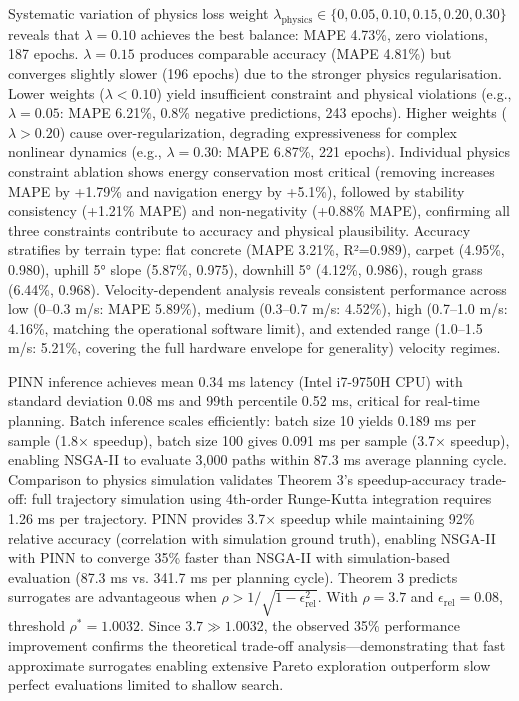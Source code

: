 \documentclass[pdflatex,sn-nature]{sn-jnl}%
\begin{document}
Systematic variation of physics loss weight $\lambda_{\text{physics}} \in \{0, 0.05, 0.10, 0.15, 0.20, 0.30\}$ reveals that $\lambda=0.10$ achieves the best balance: MAPE 4.73\%, zero violations, 187 epochs. $\lambda=0.15$ produces comparable accuracy (MAPE 4.81\%) but converges slightly slower (196 epochs) due to the stronger physics regularisation. Lower weights ($\lambda < 0.10$) yield insufficient constraint and physical violations (e.g., $\lambda=0.05$: MAPE 6.21\%, 0.8\% negative predictions, 243 epochs). Higher weights ($\lambda > 0.20$) cause over-regularization, degrading expressiveness for complex nonlinear dynamics (e.g., $\lambda=0.30$: MAPE 6.87\%, 221 epochs). Individual physics constraint ablation shows energy conservation most critical (removing increases MAPE by +1.79\% and navigation energy by +5.1\%), followed by stability consistency (+1.21\% MAPE) and non-negativity (+0.88\% MAPE), confirming all three constraints contribute to accuracy and physical plausibility. Accuracy stratifies by terrain type: flat concrete (MAPE 3.21\%, R²=0.989), carpet (4.95\%, 0.980), uphill 5° slope (5.87\%, 0.975), downhill 5° (4.12\%, 0.986), rough grass (6.44\%, 0.968). Velocity-dependent analysis reveals consistent performance across low (0--0.3 m/s: MAPE 5.89\%), medium (0.3--0.7 m/s: 4.52\%), high (0.7--1.0 m/s: 4.16\%, matching the operational software limit), and extended range (1.0--1.5 m/s: 5.21\%, covering the full hardware envelope for generality) velocity regimes.

PINN inference achieves mean 0.34 ms latency (Intel i7-9750H CPU) with standard deviation 0.08 ms and 99th percentile 0.52 ms, critical for real-time planning. Batch inference scales efficiently: batch size 10 yields 0.189 ms per sample (1.8× speedup), batch size 100 gives 0.091 ms per sample (3.7× speedup), enabling NSGA-II to evaluate 3,000 paths within 87.3 ms average planning cycle. Comparison to physics simulation validates Theorem 3's speedup-accuracy trade-off: full trajectory simulation using 4th-order Runge-Kutta integration requires 1.26 ms per trajectory. PINN provides 3.7× speedup while maintaining 92\% relative accuracy (correlation with simulation ground truth), enabling NSGA-II with PINN to converge 35\% faster than NSGA-II with simulation-based evaluation (87.3 ms vs. 341.7 ms per planning cycle). Theorem 3 predicts surrogates are advantageous when $\rho > 1/\sqrt{1-\epsilon_{\text{rel}}^2}$. With $\rho=3.7$ and $\epsilon_{\text{rel}}=0.08$, threshold $\rho^*=1.0032$. Since $3.7 \gg 1.0032$, the observed 35\% performance improvement confirms the theoretical trade-off analysis—demonstrating that fast approximate surrogates enabling extensive Pareto exploration outperform slow perfect evaluations limited to shallow search.
\end{document}
